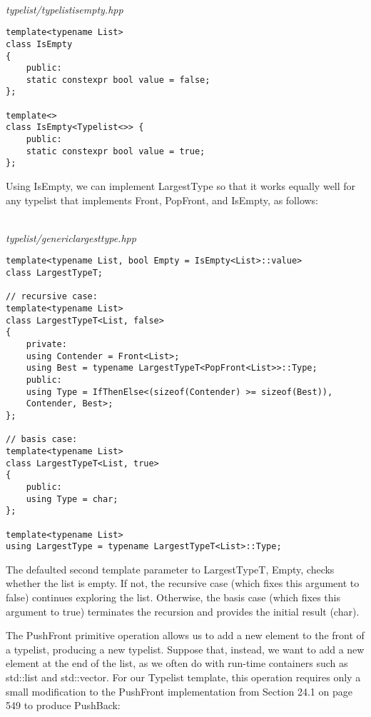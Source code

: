 \hspace*{\fill} \\ %
\noindent
\textit{typelist/typelistisempty.hpp}
\begin{lstlisting}[style=styleCXX]
template<typename List>
class IsEmpty
{
	public:
	static constexpr bool value = false;
};

template<>
class IsEmpty<Typelist<>> {
	public:
	static constexpr bool value = true;
};
\end{lstlisting}

Using IsEmpty, we can implement LargestType so that it works equally well for any typelist that implements Front, PopFront, and IsEmpty, as follows:

\hspace*{\fill} \\ %
\noindent
\textit{typelist/genericlargesttype.hpp}
\begin{lstlisting}[style=styleCXX]
template<typename List, bool Empty = IsEmpty<List>::value>
class LargestTypeT;

// recursive case:
template<typename List>
class LargestTypeT<List, false>
{
	private:
	using Contender = Front<List>;
	using Best = typename LargestTypeT<PopFront<List>>::Type;
	public:
	using Type = IfThenElse<(sizeof(Contender) >= sizeof(Best)),
	Contender, Best>;
};

// basis case:
template<typename List>
class LargestTypeT<List, true>
{
	public:
	using Type = char;
};

template<typename List>
using LargestType = typename LargestTypeT<List>::Type;
\end{lstlisting}

The defaulted second template parameter to LargestTypeT, Empty, checks whether the list is empty. If not, the recursive case (which fixes this argument to false) continues exploring the list. Otherwise, the basis case (which fixes this argument to true) terminates the recursion and provides the initial result (char).


The PushFront primitive operation allows us to add a new element to the front of a typelist, producing a new typelist. Suppose that, instead, we want to add a new element at the end of the list, as we often do with run-time containers such as std::list and std::vector. For our Typelist template, this operation requires only a small modification to the PushFront implementation from Section 24.1 on page 549 to produce PushBack:

